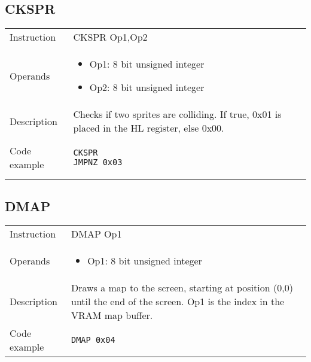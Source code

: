 \subsection{CKSPR}
\renewcommand*{\arraystretch}{2.0}
\begin{longtable}{P{3cm}P{9cm}}
\midrule
\noindent Instruction & CKSPR Op1,Op2 \\
\noindent Operands &
\begin{itemize}[label={},noitemsep,leftmargin=*,topsep=0pt,partopsep=0pt, itemsep=1em]
\item Op1: 8 bit unsigned integer

\item Op2: 8 bit unsigned integer
\end{itemize}\\
\noindent Description & Checks if two sprites are colliding. If true, 0x01 is placed in the HL register, else 0x00. \\
\noindent Code example & 
\begin{lstlisting}
CKSPR
JMPNZ 0x03
\end{lstlisting} \\
\end{longtable}

\newpage

\subsection{DMAP}
\renewcommand*{\arraystretch}{2.0}
\begin{longtable}{P{3cm}P{9cm}}
\midrule
\noindent Instruction & DMAP Op1 \\
\noindent Operands &
\begin{itemize}[label={},noitemsep,leftmargin=*,topsep=0pt,partopsep=0pt, itemsep=1em]
\item Op1: 8 bit unsigned integer
\end{itemize}\\
\noindent Description & Draws a map to the screen, starting at position (0,0) until the end of the screen. Op1 is the index in the VRAM map buffer. \\
\noindent Code example & 
\begin{lstlisting}
DMAP 0x04
\end{lstlisting} \\
\end{longtable}


